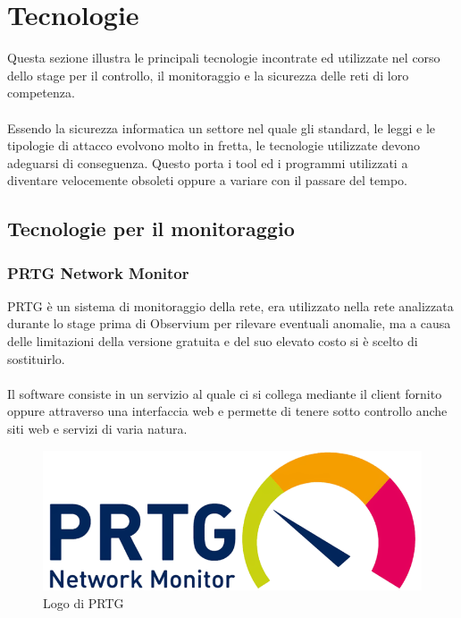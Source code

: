 \documentclass[Tesi.tex]{subfiles}
\begin{document}
\chapter{Tecnologie}

Questa sezione illustra le principali tecnologie incontrate ed utilizzate nel corso dello stage per il controllo, il monitoraggio e la sicurezza delle reti di loro competenza. \\\\
Essendo la sicurezza informatica un settore nel quale gli standard, le leggi e le tipologie di attacco evolvono molto in fretta, le tecnologie utilizzate devono adeguarsi di conseguenza. Questo porta i tool ed i programmi utilizzati a diventare velocemente obsoleti oppure a variare con il passare del tempo.

\section{Tecnologie per il monitoraggio}
\subsection{PRTG Network Monitor}
PRTG è un sistema di monitoraggio della rete, era utilizzato nella rete analizzata durante lo stage prima di Observium per rilevare eventuali anomalie, ma a causa delle limitazioni della versione gratuita e del suo elevato costo si è scelto di sostituirlo.\\\\
Il software consiste in un servizio al quale ci si collega mediante il client fornito oppure attraverso una interfaccia web e permette di tenere sotto controllo anche siti web e servizi di varia natura.
\begin{figure}[H]
	\centering
	\includegraphics[width=0.5\linewidth]{"images/logo/PRTG_logo"}
	\caption{Logo di PRTG}
	\label{fig:Logo di PRTG}
\end{figure}
\end{document}
